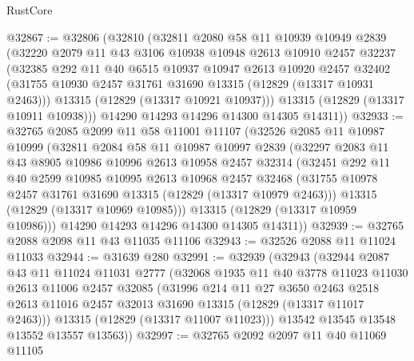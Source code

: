 \begin{lexlean}{RustCore}
\begin{coremodule}
@32867 := @32806
    (@32810
      (@32811
        @2080
        @58
        @11
        @10939
        @10949
        @2839
        (@32220
          @2079
          @11
          @43
          @3106
          @10938
          @10948
          @2613
          @10910
          @2457
          @32237
          (@32385
            @292
            @11
            @40
            @6515
            @10937
            @10947
            @2613
            @10920
            @2457
            @32402
            (@31755 @10930 @2457 @31761 @31690 @13315 (@12829 (@13317 @10931 @2463)))
            @13315
            (@12829 (@13317 @10921 @10937)))
          @13315
          (@12829 (@13317 @10911 @10938)))
        @14290
        @14293
        @14296
        @14300
        @14305
        @14311))
@32933 := @32765
    @2085
    @2099
    @11
    @58
    @11001
    @11107
    (@32526
      @2085
      @11
      @10987
      @10999
      (@32811
        @2084
        @58
        @11
        @10987
        @10997
        @2839
        (@32297
          @2083
          @11
          @43
          @8905
          @10986
          @10996
          @2613
          @10958
          @2457
          @32314
          (@32451
            @292
            @11
            @40
            @2599
            @10985
            @10995
            @2613
            @10968
            @2457
            @32468
            (@31755 @10978 @2457 @31761 @31690 @13315 (@12829 (@13317 @10979 @2463)))
            @13315
            (@12829 (@13317 @10969 @10985)))
          @13315
          (@12829 (@13317 @10959 @10986)))
        @14290
        @14293
        @14296
        @14300
        @14305
        @14311))
@32939 := @32765 @2088 @2098 @11 @43 @11035 @11106
@32943 := @32526 @2088 @11 @11024 @11033
@32944 := @31639 @280
@32991 := @32939
    (@32943
      (@32944
        @2087
        @43
        @11
        @11024
        @11031
        @2777
        (@32068
          @1935
          @11
          @40
          @3778
          @11023
          @11030
          @2613
          @11006
          @2457
          @32085
          (@31996
            @214
            @11
            @27
            @3650
            @2463
            @2518
            @2613
            @11016
            @2457
            @32013
            @31690
            @13315
            (@12829 (@13317 @11017 @2463)))
          @13315
          (@12829 (@13317 @11007 @11023)))
        @13542
        @13545
        @13548
        @13552
        @13557
        @13563))
@32997 := @32765 @2092 @2097 @11 @40 @11069 @11105

\end{coremodule}
\end{lexlean}
